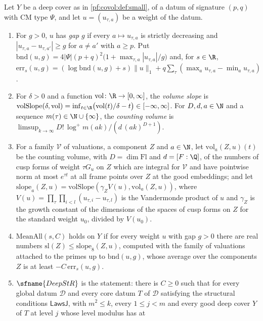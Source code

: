 \begin{definition}\label{pf:covol:def:deepstr}
Let $Y$ be a deep cover as in \cref{pf:covol:def:small}, of a datum of signature $(p,q)$ with CM type
$\Psi$, and let $u=(u_{\tau,a})$ be a weight of the datum.
\begin{enumerate}[label=(\alph*)]
\item For $g>0$, $u$ has \emph{gap} $g$ if every $a\mapsto u_{\tau,a}$ is strictly decreasing and
  $|u_{\tau,a}-u_{\tau,a'}|\ge g$ for $a\ne a'$ with $a\ge p$. Put
  $\mathrm{bnd}(u,g)=4|\Psi|(p+q)^2\bigl(1+\max_{\tau,a}|u_{\tau,a}|/g\bigr)$ and, for $s\in\R$,
  $\mathrm{err}_s(u,g)=(\log\mathrm{bnd}(u,g)+s)\|u\|_1+q\sum_\tau(\max_au_{\tau,a}-\min_au_{\tau,a})$.
\item For $\delta>0$ and a function $\mathrm{vol}\colon\R\to[0,\infty]$, the \emph{volume slope} is
  $\mathrm{volSlope}(\delta,\mathrm{vol})=\inf_{t\in\R}\bigl(\mathrm{vol}(t)/\delta-t\bigr)\in[-\infty,\infty]$.
  For $D,d,a\in\N$ and a sequence $m(\tau)\in\N\cup\{\infty\}$, the \emph{counting volume} is
  $\limsup_{k\to\infty}D!\,\log^+m(ak)/(d\,(ak)^{D+1})$.
\item For a family $\mathcal V$ of valuations, a component $Z$ and $a\in\N$, let $\mathrm{vol}_{a}(Z,u)(t)$
  be the counting volume, with $D=\dim\mathrm{Fl}$ and $d=[F:\Q]$, of the numbers of cusp forms of weight
  $\tau G_u$ on $Z$ which are integral for $\mathcal V$ and have pointwise norm at most $e^{\tau t}$ at all
  frame points over $Z$ at the good embeddings; and let
  $\mathrm{slope}_a(Z,u)=\mathrm{volSlope}(\gamma_ZV(u),\mathrm{vol}_a(Z,u))$, where
  $V(u)=\prod_\tau\prod_{i<l}(u_{\tau,i}-u_{\tau,l})$ is the Vandermonde product of $u$ and $\gamma_Z$ is
  the growth constant of the dimensions of the spaces of cusp forms on $Z$ for the standard weight $u_0$,
  divided by $V(u_0)$.
\item $\mathrm{MeanAll}(s,C)$ holds on $Y$ if for every weight $u$ with gap $g>0$ there are real numbers
  $\mathrm{sl}(Z)\le\mathrm{slope}_8(Z,u)$, computed with the family of valuations attached to the primes
  up to $\mathrm{bnd}(u,g)$, whose average over the components $Z$ is at least
  $-C\,\mathrm{err}_s(u,g)$.
\item $\sfname{DeepStR}$ is the statement: there is $C\ge0$ such that for every global datum $\mathcal D$
  and every core datum $T$ of $\mathcal D$ satisfying the structural conditions $\mathsf{LawsJ}$, with
  $m^2\le k$, every $1\le j<m$ and every good deep cover $Y$ of $T$ at level $j$ whose level modulus has at

\end{enumerate}
\end{definition}
